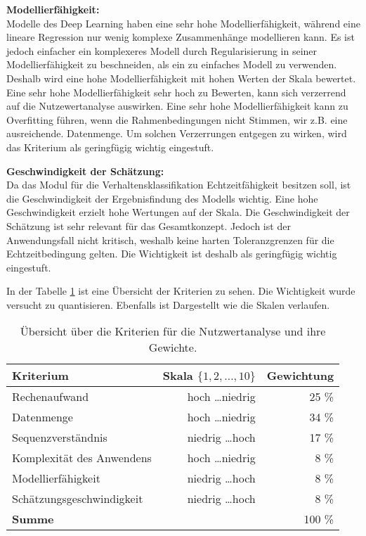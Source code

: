 \textbf{Modellierfähigkeit:}\\
Modelle des \gls{Deep Learning} haben eine sehr hohe Modellierfähigkeit, während eine lineare Regression nur wenig komplexe Zusammenhänge modellieren kann. Es ist jedoch einfacher ein komplexeres Modell durch Regularisierung in seiner Modellierfähigkeit zu beschneiden, als ein zu einfaches Modell zu verwenden. Deshalb wird eine hohe Modellierfähigkeit mit hohen Werten der Skala bewertet. Eine sehr hohe Modellierfähigkeit sehr hoch zu Bewerten, kann sich verzerrend auf die Nutzewertanalyse auswirken. Eine sehr hohe Modellierfähigkeit kann zu \gls{Overfitting} führen, wenn die Rahmenbedingungen nicht Stimmen, wir z.B. eine ausreichende. Datenmenge. Um solchen Verzerrungen entgegen zu wirken, wird das Kriterium als geringfügig wichtig eingestuft. \par

\textbf{Geschwindigkeit der Schätzung:}\\
Da das \gls{Modul} für die Verhaltensklassifikation Echtzeitfähigkeit besitzen soll, ist die Geschwindigkeit der Ergebnisfindung des Modells wichtig. Eine hohe Geschwindigkeit erzielt hohe Wertungen auf der Skala. Die Geschwindigkeit der Schätzung ist sehr relevant für das Gesamtkonzept. Jedoch ist der Anwendungsfall nicht kritisch, weshalb keine harten Toleranzgrenzen für die Echtzeitbedingung gelten. Die Wichtigkeit ist deshalb als geringfügig wichtig eingestuft. \par

In der Tabelle \ref{tab:NWAKriterien} ist eine Übersicht der Kriterien zu sehen. Die Wichtigkeit wurde versucht zu quantisieren. Ebenfalls ist Dargestellt wie die Skalen verlaufen.


\begin{table}[ht]
    \centering
    \begin{tabular}{|l|r|r|}
         \hline
         \textbf{Kriterium}                      & \textbf{Skala \(\{1,2,\dots,10\}\)}    & \textbf{Gewichtung}\\
         \hline
         Rechenaufwand                  & hoch \dots niedrig            & 25 \%\\
         \hline
         Datenmenge                     & hoch \dots niedrig            & 34 \%\\
         \hline
         Sequenzverständnis             & niedrig \dots hoch            & 17 \%\\
         \hline
         Komplexität des Anwendens      & hoch \dots niedrig            & 8 \%\\
         \hline
         Modellierfähigkeit             & niedrig \dots hoch            & 8 \%\\
         \hline
         Schätzungsgeschwindigkeit  & niedrig \dots hoch            & 8 \%\\
         \hline
         \textbf{Summe}                 &                               & 100 \%\\
         \hline
    \end{tabular}
    \caption{Übersicht über die Kriterien für die Nutzwertanalyse und ihre Gewichte.}
    \label{tab:NWAKriterien}
\end{table}

